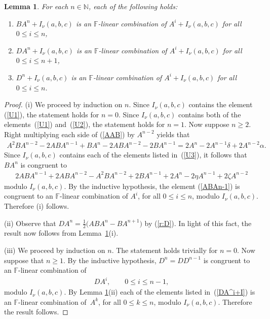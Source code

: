 \documentclass[11pt]{article}
\numberwithin{equation}{section}
\def\N{\mathbb N}
\def\F{\mathbb F}
\numberwithin{equation}{section}
\newtheorem{Lemma}[Theorem]{Lemma}
\begin{document}
\begin{Lemma}\label{lem:cosets}For each $n\in \N$, each of the following holds:
\begin{enumerate}\itemsep=0pt
\item[$(i)$] $BA^n+I_\nu(a,b,c)$ is an $\F$-linear combination of $A^i+I_\nu(a,b,c)$ for all $0\leq i\leq n$,
\item[$(ii)$] $DA^n+I_\nu(a,b,c)$ is an $\F$-linear combination of $A^i+I_\nu(a,b,c)$ for all $0\leq i\leq n+1$,
\item[$(iii)$] $D^n+I_\nu(a,b,c)$ is an $\F$-linear combination of $A^i+I_\nu(a,b,c)$ for all $0\leq i\leq n$.
\end{enumerate}
\end{Lemma}
\begin{proof} (i) We proceed by induction on $n$. Since $I_\nu(a,b,c)$ contains the element (\ref{U1}), the statement holds for $n=0$. Since $I_\nu(a,b,c)$ contains both of the elements~(\ref{U1}) and~(\ref{U2}), the statement holds for $n=1$. Now suppose $n\geq 2$. Right multiplying each side of (\ref{AAB}) by $A^{n-2}$ yields that
\begin{gather*}
A^2 B A^{n-2}
-2 A B A^{n-1}
+B A^n
-2 A B A^{n-2}
-2 B A^{n-1}
=2 A^n-2 A^{n-1}\delta+2A^{n-2}\alpha.
\end{gather*}
Since $I_\nu(a,b,c)$ contains each of the elements listed in~(\ref{U3}), it follows that $B A^n$ is congruent to
\begin{gather}\label{ABAn-1}
2 A B A^{n-1}+2 A B A^{n-2}-A^2 B A^{n-2}+2 B A^{n-1}+2 A^n-2\eta A^{n-1}+2\zeta A^{n-2}
\end{gather}
modulo $I_\nu(a,b,c)$. By the inductive hypothesis, the element (\ref{ABAn-1}) is congruent to an $\F$-linear combination of $A^i$, for all $0\leq i\leq n$, modulo $I_\nu(a,b,c)$. Therefore (i) follows.

(ii) Observe that $DA^n=\frac{1}{2}\big(ABA^{n}-BA^{n+1}\big)$ by (\ref{r:D}). In light of this fact, the result now follows from Lemma~\ref{lem:cosets}(i).

(iii) We proceed by induction on $n$. The statement holds trivially for $n=0$. Now suppose that $n\geq 1$. By the inductive hypothesis, $D^n=DD^{n-1}$ is congruent to an $\F$-linear combination of
\begin{gather}\label{DA^i+I}
DA^i, \qquad 0\leq i\leq n-1,
\end{gather}
modulo $I_\nu(a,b,c)$. By Lemma \ref{lem:cosets}(ii) each of the elements listed in~(\ref{DA^i+I}) is an $\F$-linear combination of~$A^k$, for all $0\leq k\leq n$, modulo $I_\nu(a,b,c)$. Therefore the result follows.
\end{proof}
\end{document}
